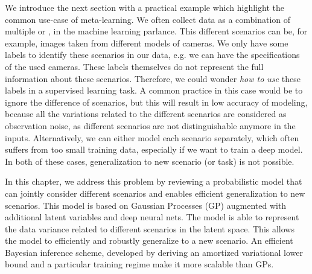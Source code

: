 
\bigbreak 

We introduce the next section with a practical example which highlight the common use-case of meta-learning. We often collect data as a combination of multiple  or , in the machine learning parlance. This different scenarios can be, for example, images taken from different models of cameras. We only have some labels to identify these scenarios in our data, e.g. we can have the specifications of the used cameras. These labels themselves do not represent the full information about these scenarios. Therefore, we could wonder \textit{how to use} these labels in a supervised learning task. A common practice in this case would be to ignore the difference of scenarios, but this will result in low accuracy of modeling, because all the variations related to the different scenarios are considered as observation noise, as different scenarios are not distinguishable anymore in the inputs. Alternatively, we can either model each scenario separately, which often suffers from too small training data, especially if we want to train a deep model. In both of these cases, generalization to new scenario (or task) is not possible.

In this chapter, we address this problem by reviewing a probabilistic model that can jointly consider different scenarios and enables efficient generalization to new scenarios. This model is based on Gaussian Processes (GP) augmented with additional latent variables and deep neural nets. The model is able to represent the data variance related to different scenarios in the latent space. This allows the model to efficiently and robustly generalize to a new scenario. An efficient Bayesian inference scheme, developed by deriving an amortized variational lower bound and a particular training regime make it more scalable than GPs.


